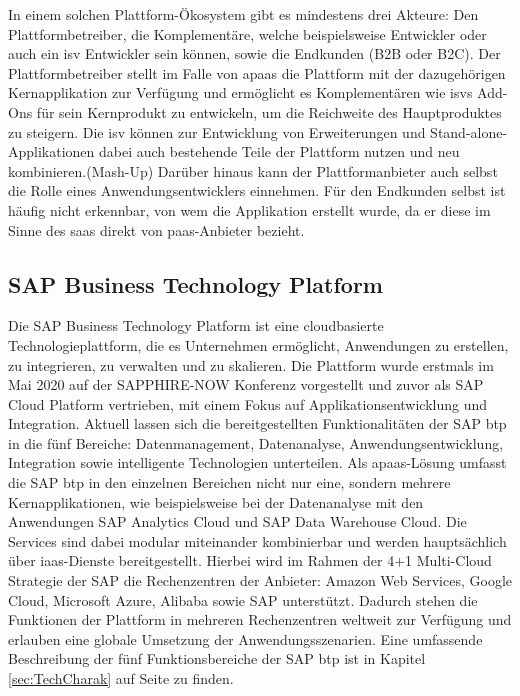 In einem solchen Plattform-Ökosystem gibt es mindestens drei Akteure: Den Plattformbetreiber, die Komplementäre, welche beispielsweise Entwickler oder auch ein \ac{isv} Entwickler sein können, sowie die Endkunden (B2B oder B2C). Der Plattformbetreiber stellt im Falle von \ac{apaas} die Plattform mit der dazugehörigen Kernapplikation zur Verfügung und ermöglicht es Komplementären wie \ac{isv}s Add-Ons für sein Kernprodukt zu entwickeln, um die Reichweite des Hauptproduktes zu steigern. Die \ac{isv} können zur Entwicklung von Erweiterungen und Stand-alone-Applikationen dabei auch bestehende Teile der Plattform nutzen und neu kombinieren.(Mash-Up) Darüber hinaus kann der Plattformanbieter auch selbst die Rolle eines Anwendungsentwicklers einnehmen.\autocite[Vgl.][S. 444f]{FOERDERER2018} Für den Endkunden selbst ist häufig nicht erkennbar, von wem die Applikation erstellt wurde, da er diese im Sinne des \ac{saas} direkt von \ac{paas}-Anbieter bezieht. \autocite[Vgl.][S. 372]{BEIMBORN2011}

\subsection{SAP Business Technology Platform}

Die SAP Business Technology Platform ist eine cloudbasierte Technologieplattform, die es Unternehmen ermöglicht, Anwendungen zu erstellen, zu integrieren, zu verwalten und zu skalieren. Die Plattform wurde erstmals im Mai 2020 auf der SAPPHIRE-NOW Konferenz vorgestellt und zuvor als SAP Cloud Platform vertrieben, mit einem Fokus auf Applikationsentwicklung und Integration.\autocite[Vgl.][S. 2]{PREUSS2021}  Aktuell lassen sich die bereitgestellten Funktionalitäten der SAP \ac{btp} in die fünf Bereiche: Datenmanagement, Datenanalyse, Anwendungsentwicklung, Integration sowie intelligente Technologien unterteilen. Als \ac{apaas}-Lösung umfasst die SAP \ac{btp} in den einzelnen Bereichen nicht nur eine, sondern mehrere Kernapplikationen, wie beispielsweise bei der Datenanalyse mit den Anwendungen SAP Analytics Cloud und SAP Data Warehouse Cloud. Die Services sind dabei modular miteinander kombinierbar und werden hauptsächlich über \ac{iaas}-Dienste bereitgestellt. Hierbei wird im Rahmen der 4+1 Multi-Cloud Strategie der SAP die Rechenzentren der Anbieter: Amazon Web Services, Google Cloud, Microsoft Azure, Alibaba sowie SAP unterstützt. Dadurch stehen die Funktionen der Plattform in mehreren Rechenzentren weltweit zur Verfügung und erlauben eine globale Umsetzung der Anwendungsszenarien.\autocite[Vgl.][S. 57-59]{SEUBERT2022} Eine umfassende Beschreibung der fünf Funktionsbereiche der SAP \ac{btp} ist in Kapitel \ref{sec:TechCharak} auf Seite \pageref{sec:TechCharak} zu finden.


